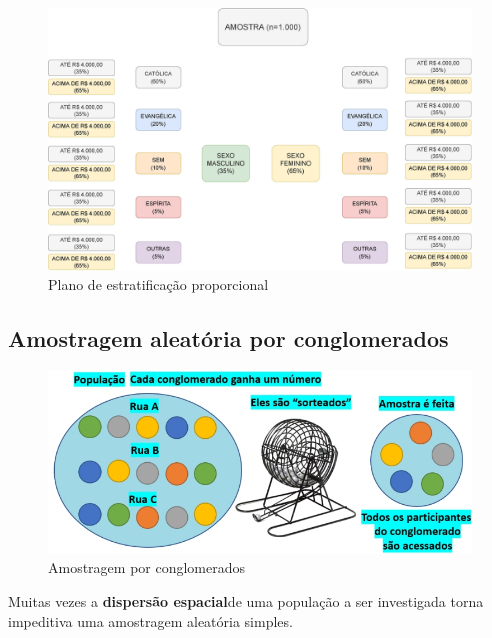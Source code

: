 \documentclass[
]{book}
\begin{document}
\hfill\break

\begin{figure}

{\centering \includegraphics[width=0.8\linewidth]{images7/estratificada} 

}

\caption{Plano de estratificação proporcional}\label{fig:fig39}
\end{figure}

\hfill\break

\hypertarget{amostragem-aleatuxf3ria-por-conglomerados}{%
\subsection{Amostragem aleatória por conglomerados}\label{amostragem-aleatuxf3ria-por-conglomerados}}

\hfill\break

\begin{figure}

{\centering \includegraphics[width=0.8\linewidth]{images7/conglomerado} 

}

\caption{Amostragem por conglomerados}\label{fig:fig40}
\end{figure}

\hfill\break

Muitas vezes a \textbf{dispersão espacial}de uma população a ser investigada torna impeditiva uma amostragem aleatória simples.
\end{document}
